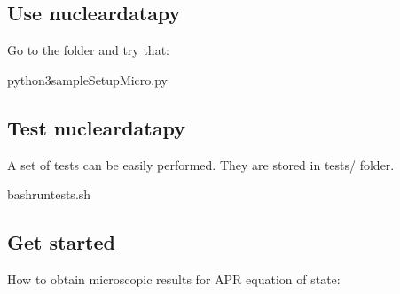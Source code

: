 \documentclass[letterpaper,10pt,english]{sphinxmanual}
\begin{document}
\subsection{Use nucleardatapy}
\label{\detokenize{source/usage:use-nucleardatapy}}\label{\detokenize{source/usage:use}}
\sphinxAtStartPar
Go to the folder  and try that:

\begin{sphinxVerbatim}[commandchars=\\\{\}]
python3sample\PYGZus{}SetupMicro.py
\end{sphinxVerbatim}


\subsection{Test nucleardatapy}
\label{\detokenize{source/usage:test-nucleardatapy}}\label{\detokenize{source/usage:test}}
\sphinxAtStartPar
A set of tests can be easily performed. They are stored in tests/ folder.

\begin{sphinxVerbatim}[commandchars=\\\{\}]
bashrun\PYGZus{}tests.sh
\end{sphinxVerbatim}


\subsection{Get started}
\label{\detokenize{source/usage:get-started}}\label{\detokenize{source/usage:id2}}
\sphinxAtStartPar
How to obtain microscopic results for APR equation of state:

\begin{sphinxVerbatim}[commandchars=\\\{\}]
 
  
 

   

      

 
\end{sphinxVerbatim}
\end{document}
